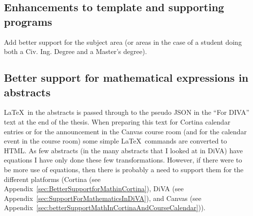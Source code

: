 \subsection{Enhancements to template and supporting programs}
\label{sec:enhancementsToTemplate}
Add better support for the subject area (or areas in the case of a student doing both a Civ. Ing. Degree and a Master’s degree).

\subsection{Better support for mathematical expressions in abstracts}
\label{sec:betterSupportForMathInAbstracts}
\LaTeX~in the abstracts is passed through to the pseudo JSON in the “For DIVA” text at the end of the thesis. When preparing this text for Cortina calendar entries or for the announcement in the Canvas course room (and for the calendar event in the course room) some simple \LaTeX~commands are converted to HTML. As few abstracts (in the many abstracts that I looked at in DiVA) have equations I have only done these few transformations. However, if there were to be more use of equations, then there is probably a need to support them for the different platforms (Cortina (see Appendix~\ref{sec:BetterSupportforMathinCortina}), DiVA (see Appendix~\ref{sec:SupportForMathematicsInDiVA}), and Canvas (see Appendix~\ref{sec:betterSupportMathInCortinaAndCourseCalendar})).


